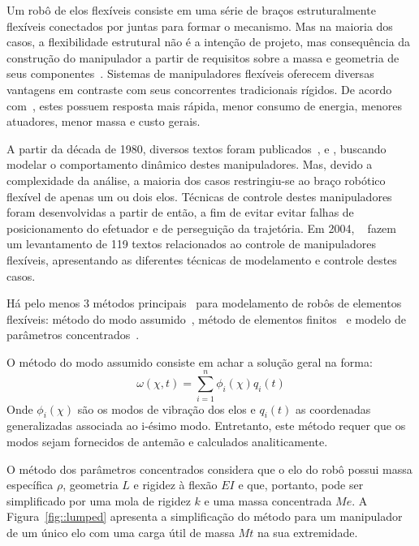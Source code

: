Um robô de elos flexíveis consiste em uma série de braços estruturalmente
flexíveis conectados por juntas para formar o mecanismo. Mas na maioria dos
casos, a flexibilidade estrutural não é a intenção de projeto, mas consequência
da construção do manipulador a partir de requisitos sobre a massa e geometria de
seus componentes~\cite{moallem2000flexible}.
Sistemas de manipuladores flexíveis oferecem diversas vantagens em contraste com
seus concorrentes tradicionais rígidos. De acordo com~\cite{tokhi2008flexible},
estes possuem resposta mais rápida, menor consumo de energia, menores atuadores,
menor massa e custo gerais.


A partir da década de 1980, diversos textos foram
publicados~\cite{sunada1983dynamic}, \cite{bayo1987finite} e
\cite{yang1988dynamic}, buscando modelar o comportamento dinâmico destes
manipuladores. Mas, devido a complexidade da análise, a maioria dos casos
restringiu-se ao braço robótico flexível de apenas um ou dois elos. Técnicas de
controle destes manipuladores foram desenvolvidas a partir de então, a fim de
evitar evitar falhas de posicionamento do efetuador e de perseguição da
trajetória.
Em 2004, ~\citet{benosman2004control} fazem um levantamento de 119 textos
relacionados ao controle de manipuladores flexíveis, apresentando as diferentes
técnicas de modelamento e controle destes casos.

Há pelo menos 3 métodos principais~\cite{dwivedy2006dynamic} para modelamento de
robôs de elementos flexíveis: método do modo
assumido~\cite{robinett2012flexible}, método de elementos
finitos~\cite{bricout1990finite} e modelo de parâmetros
concentrados~\cite{zhu1999simulation}.

O método do modo assumido consiste em achar a solução geral na forma:
%
\begin{equation}
	\omega (\chi ,t) = \sum_{i=1}^{n}\phi_i(\chi ) q_i(t)
\end{equation}
%
Onde $\phi_i(\chi)$ são os modos de vibração dos elos e $q_i(t)$ as coordenadas
generalizadas associada ao i-ésimo modo. Entretanto, este método requer que os
modos sejam fornecidos de antemão e calculados analiticamente.

O método dos parâmetros concentrados considera que o elo do robô possui massa
específica $\rho$, geometria $L$ e rigidez à flexão $EI$ e que, portanto, pode
ser simplificado por uma mola de rigidez $k$ e uma massa concentrada $Me$. A
Figura~\ref{fig::lumped} apresenta a simplificação do método para um manipulador
de um único elo com uma carga útil de massa $Mt$ na sua extremidade.

